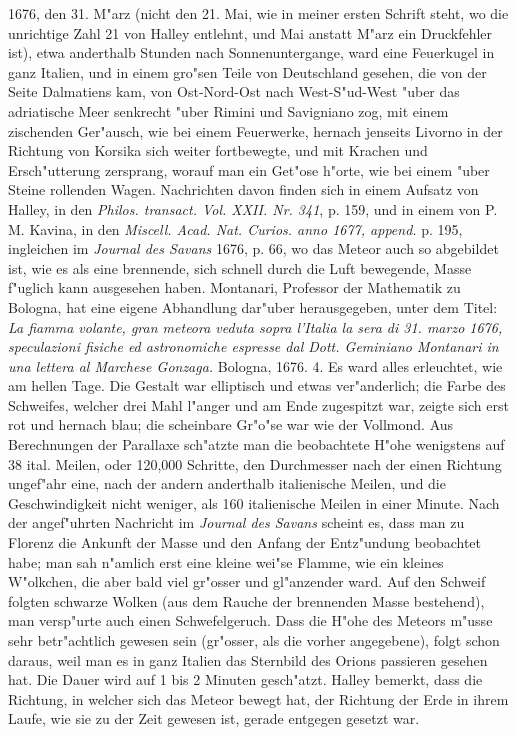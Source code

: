 \documentclass[a4paper, 11pt, oneside, polutonikogreek, german]{article}
\begin{document}
1676, den 31. M"arz (nicht den 21. Mai, wie in meiner ersten Schrift steht, wo die unrichtige Zahl 21 von Halley entlehnt, und Mai anstatt M"arz ein Druckfehler ist), etwa anderthalb Stunden nach Sonnenuntergange, ward eine Feuerkugel in ganz Italien, und in einem gro"sen Teile von Deutschland gesehen, die von der Seite Dalmatiens kam, von Ost-Nord-Ost nach West-S"ud-West "uber das adriatische Meer senkrecht "uber Rimini und Savigniano zog, mit einem zischenden Ger"ausch, wie bei einem Feuerwerke, hernach jenseits Livorno in der Richtung von Korsika sich weiter fortbewegte, und mit Krachen und Ersch"utterung zersprang, worauf man ein Get"ose h"orte, wie bei einem "uber Steine rollenden Wagen. Nachrichten davon finden sich in einem Aufsatz von Halley, in den \emph{Philos. transact. Vol. XXII. Nr. 341}, p. 159, und in einem von P. M. Kavina, in den \emph{Miscell. Acad. Nat. Curios. anno 1677, append.} p. 195, ingleichen im \emph{Journal des Savans} 1676, p. 66, wo das Meteor auch so abgebildet ist, wie es als eine brennende, sich schnell durch die Luft bewegende, Masse f"uglich kann ausgesehen haben. Montanari, Professor der Mathematik zu Bologna, hat eine eigene Abhandlung dar"uber herausgegeben, unter dem Titel: \emph{La fiamma volante, gran meteora veduta sopra l'Italia la sera di 31. marzo 1676, speculazioni fisiche ed astronomiche espresse dal Dott. Geminiano Montanari in una lettera al Marchese Gonzaga.} Bologna, 1676. 4. Es ward alles erleuchtet, wie am hellen Tage. Die Gestalt war elliptisch und etwas ver"anderlich; die Farbe des Schweifes, welcher drei Mahl l"anger und am Ende zugespitzt war, zeigte sich erst rot und hernach blau; die scheinbare Gr"o"se war wie der Vollmond. Aus Berechnungen der Parallaxe sch"atzte man die beobachtete H"ohe wenigstens auf 38 ital. Meilen, oder 120,000 Schritte, den Durchmesser nach der einen Richtung ungef"ahr eine, nach der andern anderthalb italienische Meilen, und die Geschwindigkeit nicht weniger, als 160 italienische Meilen in einer Minute. Nach der angef"uhrten Nachricht im \emph{Journal des Savans} scheint es, dass man zu Florenz die Ankunft der Masse und den Anfang der Entz"undung beobachtet habe; man sah n"amlich erst eine kleine wei"se Flamme, wie ein kleines W"olkchen, die aber bald viel gr"osser und gl"anzender ward. Auf den Schweif folgten schwarze Wolken (aus dem Rauche der brennenden Masse bestehend), man versp"urte auch einen Schwefelgeruch. Dass die H"ohe des Meteors m"usse sehr betr"achtlich gewesen sein (gr"osser, als die vorher angegebene), folgt schon daraus, weil man es in ganz Italien das Sternbild des Orions passieren gesehen hat. Die Dauer wird auf 1 bis 2 Minuten gesch"atzt. Halley bemerkt, dass die Richtung, in welcher sich das Meteor bewegt hat, der Richtung der Erde in ihrem Laufe, wie sie zu der Zeit gewesen ist, gerade entgegen gesetzt war.
\end{document}

